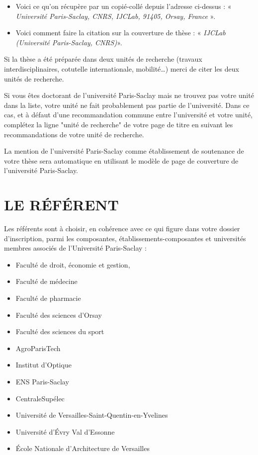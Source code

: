 \documentclass[main=french,a4paper]{book}
\begin{document}
\begin{itemize}
\renewcommand{\labelitemi}{$\bullet$}
\item Voici ce qu’on récupère par un copié-collé depuis l’adresse ci-dessus : « \textit{Université Paris-Saclay, CNRS, IJCLab, 91405, Orsay, France} ».
\item Voici comment faire la citation sur la couverture de thèse : « \textit{IJCLab (Université Paris-Saclay, CNRS)}».
\end{itemize}

Si la thèse a été préparée dans deux unités de recherche (travaux interdisciplinaires, cotutelle internationale, mobilité…) merci de citer les deux unités de recherche.\\ \par
Si vous êtes doctorant de l'université Paris-Saclay mais ne trouvez pas votre unité dans la liste, votre unité ne fait probablement pas partie de l'université. Dans ce cas, et à défaut d'une recommandation commune entre l'université et votre unité, complétez la ligne "unité de recherche" de votre page de titre en suivant les recommandations de votre unité de recherche.\\ \par
La mention de l'université Paris-Saclay comme établissement de soutenance de votre thèse sera automatique en utilisant le modèle de page de couverture de l'université Paris-Saclay.

\section{LE RÉFÉRENT}
Les référents sont à choisir, en cohérence avec ce qui figure dans votre dossier d’inscription, parmi les composantes, établissements-composantes et universités membres associés de l’Université Paris-Saclay :

\begin{itemize}
\renewcommand{\labelitemi}{$\bullet$}
\item Faculté de droit, économie et gestion, 
\item Faculté de médecine
\item Faculté de pharmacie
\item Faculté des sciences d’Orsay
\item Faculté des sciences du sport 
\item AgroParisTech
\item Institut d’Optique
\item ENS Paris-Saclay
\item CentraleSupélec
\item Université de Versailles-Saint-Quentin-en-Yvelines
\item Université d'Évry Val d’Essonne
\item École Nationale d’Architecture de Versailles 
\end{itemize}
\end{document}
